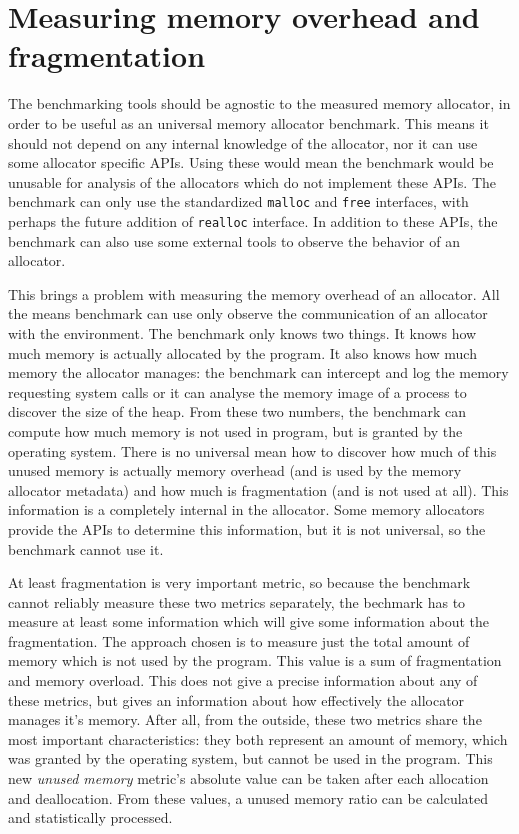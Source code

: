 \section{Measuring memory overhead and fragmentation}
\label{methodology:fragmentation}
The benchmarking tools should be agnostic to the measured memory allocator, in order to be useful as an universal memory allocator benchmark. This means it should not depend on any internal knowledge of the allocator, nor it can use some allocator specific APIs. Using these would mean the benchmark would be unusable for analysis of the allocators which do not implement these APIs. The benchmark can only use the standardized {\tt malloc} and {\tt free} interfaces, with perhaps the future addition of {\tt realloc} interface. In addition to these APIs, the benchmark can also use some external tools to observe the behavior of an allocator.

This brings a problem with measuring the memory overhead of an allocator. All the means benchmark can use only observe the communication of an allocator with the environment. The benchmark only knows two things. It knows how much memory is actually allocated by the program. It also knows how much memory the allocator manages: the benchmark can intercept and log the memory requesting system calls or it can analyse the memory image of a process to discover the size of the heap. From these two numbers, the benchmark can compute how much memory is not used in program, but is granted by the operating system. There is no universal mean how to discover how much of this unused memory is actually memory overhead (and is used by the memory allocator metadata) and how much is fragmentation (and is not used at all). This information is a completely internal in the allocator. Some memory allocators provide the APIs to determine this information, but it is not universal, so the benchmark cannot use it.

At least fragmentation is very important metric, so because the benchmark cannot reliably measure these two metrics separately, the bechmark has to measure at least some information which will give some information about the fragmentation. The approach chosen is to measure just the total amount of memory which is not used by the program. This value is a sum of fragmentation and memory overload. This does not give a precise information about any of these metrics, but gives an information about how effectively the allocator manages it's memory. After all, from the outside, these two metrics share the most important characteristics: they both represent an amount of memory, which was granted by the operating system, but cannot be used in the program. This new {\em unused memory} metric's absolute value can be taken after each allocation and deallocation. From these values, a unused memory ratio can be calculated and statistically processed.

